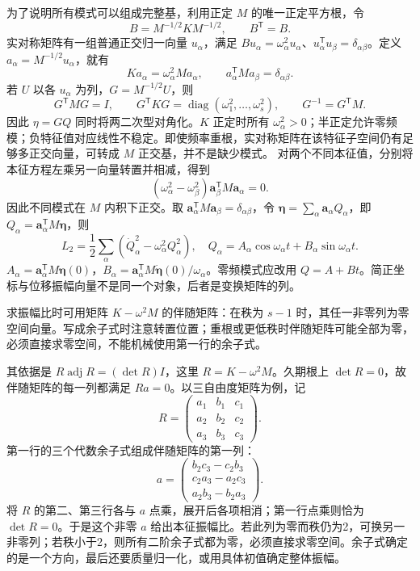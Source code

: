 \documentclass[UTF8,zihao=-4,fontset=fandol,a4paper]{ctexart}
\newcommand{\vect}[1]{\bm{#1}}\newcommand{\dd}{\mathrm d}\newcommand{\pd}{\partial}
\begin{document}
为了说明所有模式可以组成完整基，利用正定 $M$ 的唯一正定平方根，令
\[
B=M^{-1/2}KM^{-1/2},\qquad B^{\mathsf T}=B.
\]
实对称矩阵有一组普通正交归一向量 $u_\alpha$，满足 $Bu_\alpha=\omega_\alpha^2u_\alpha$、$u_\alpha^{\mathsf T}u_\beta=\delta_{\alpha\beta}$。定义 $a_\alpha=M^{-1/2}u_\alpha$，就有
\[
Ka_\alpha=\omega_\alpha^2Ma_\alpha,
\qquad a_\alpha^{\mathsf T}Ma_\beta=\delta_{\alpha\beta}.
\]
若 $U$ 以各 $u_\alpha$ 为列，$G=M^{-1/2}U$，则
\[
G^{\mathsf T}MG=I,\qquad
G^{\mathsf T}KG=\operatorname{diag}(\omega_1^2,\ldots,\omega_s^2),\qquad
G^{-1}=G^{\mathsf T}M.
\]
因此 $\eta=GQ$ 同时将两二次型对角化。$K$ 正定时所有 $\omega_\alpha^2>0$；半正定允许零频模；负特征值对应线性不稳定。即使频率重根，实对称矩阵在该特征子空间仍有足够多正交向量，可转成 $M$ 正交基，并不是缺少模式。
对两个不同本征值，分别将本征方程左乘另一向量转置并相减，得到
\[
(\omega_\alpha^2-\omega_\beta^2)\vect a_\beta^{\mathsf T}M\vect a_\alpha=0.
\]
因此不同模式在 $M$ 内积下正交。取 $\vect a_\alpha^{\mathsf T}M\vect a_\beta=\delta_{\alpha\beta}$，令 $\vect\eta=\sum_\alpha\vect a_\alpha Q_\alpha$，即 $Q_\alpha=\vect a_\alpha^{\mathsf T}M\vect\eta$，则
\[
L_2=\frac12\sum_\alpha(\dot Q_\alpha^2-\omega_\alpha^2Q_\alpha^2),
\quad Q_\alpha=A_\alpha\cos\omega_\alpha t+B_\alpha\sin\omega_\alpha t.
\]
$A_\alpha=\vect a_\alpha^{\mathsf T}M\vect\eta(0)$，$B_\alpha=\vect a_\alpha^{\mathsf T}M\dot{\vect\eta}(0)/\omega_\alpha$。零频模式应改用 $Q=A+Bt$。简正坐标与位移振幅向量不是同一个对象，后者是变换矩阵的列。

求振幅比时可用矩阵 $K-\omega^2M$ 的伴随矩阵：在秩为 $s-1$ 时，其任一非零列为零空间向量。写成余子式时注意转置位置；重根或更低秩时伴随矩阵可能全部为零，必须直接求零空间，不能机械使用第一行的余子式。

其依据是 $R\operatorname{adj}R=(\det R)I$，这里 $R=K-\omega^2M$。久期根上 $\det R=0$，故伴随矩阵的每一列都满足 $Ra=0$。以三自由度矩阵为例，记
\[
R=\begin{pmatrix}a_1&b_1&c_1\\a_2&b_2&c_2\\a_3&b_3&c_3\end{pmatrix}.
\]
第一行的三个代数余子式组成伴随矩阵的第一列：
\[
a=\begin{pmatrix}
b_2c_3-c_2b_3\\c_2a_3-a_2c_3\\a_2b_3-b_2a_3
\end{pmatrix}.
\]
将 $R$ 的第二、第三行各与 $a$ 点乘，展开后各项相消；第一行点乘则恰为 $\det R=0$。于是这个非零 $a$ 给出本征振幅比。若此列为零而秩仍为2，可换另一非零列；若秩小于2，则所有二阶余子式都为零，必须直接求零空间。余子式确定的是一个方向，最后还要质量归一化，或用具体初值确定整体振幅。
\end{document}
